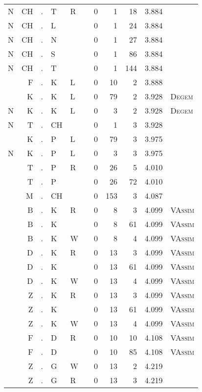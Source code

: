 \begin{longtable}{r@{ } r@{ } c@{ } l@{ } l@{ } l@{ } r r r r l }
N & CH & . & T & R &   & 0 & 1 & 18 & 3.884 &  \\
N & CH & . & L &   &   & 0 & 1 & 24 & 3.884 &  \\
N & CH & . & N &   &   & 0 & 1 & 27 & 3.884 &  \\
N & CH & . & S &   &   & 0 & 1 & 86 & 3.884 &  \\
N & CH & . & T &   &   & 0 & 1 & 144 & 3.884 &  \\
  & F & . & K & L &   & 0 & 10 & 2 & 3.888 &  \\
  & K & . & K & L &   & 0 & 79 & 2 & 3.928 & \textsc{Degem} \\
N & K & . & K & L &   & 0 & 3 & 2 & 3.928 & \textsc{Degem} \\
N & T & . & CH &   &   & 0 & 1 & 3 & 3.928 &  \\
  & K & . & P & L &   & 0 & 79 & 3 & 3.975 &  \\
N & K & . & P & L &   & 0 & 3 & 3 & 3.975 &  \\
  & T & . & P & R &   & 0 & 26 & 5 & 4.010 &  \\
  & T & . & P &   &   & 0 & 26 & 72 & 4.010 &  \\
  & M & . & CH &   &   & 0 & 153 & 3 & 4.087 &  \\
  & B & . & K & R &   & 0 & 8 & 3 & 4.099 & \textsc{VAssim} \\
  & B & . & K &   &   & 0 & 8 & 61 & 4.099 & \textsc{VAssim} \\
  & B & . & K & W &   & 0 & 8 & 4 & 4.099 & \textsc{VAssim} \\
  & D & . & K & R &   & 0 & 13 & 3 & 4.099 & \textsc{VAssim} \\
  & D & . & K &   &   & 0 & 13 & 61 & 4.099 & \textsc{VAssim} \\
  & D & . & K & W &   & 0 & 13 & 4 & 4.099 & \textsc{VAssim} \\
  & Z & . & K & R &   & 0 & 13 & 3 & 4.099 & \textsc{VAssim} \\
  & Z & . & K &   &   & 0 & 13 & 61 & 4.099 & \textsc{VAssim} \\
  & Z & . & K & W &   & 0 & 13 & 4 & 4.099 & \textsc{VAssim} \\
  & F & . & D & R &   & 0 & 10 & 10 & 4.108 & \textsc{VAssim} \\
  & F & . & D &   &   & 0 & 10 & 85 & 4.108 & \textsc{VAssim} \\
  & Z & . & G & W &   & 0 & 13 & 2 & 4.219 &  \\
  & Z & . & G & R &   & 0 & 13 & 3 & 4.219 &  \\

\end{longtable}
